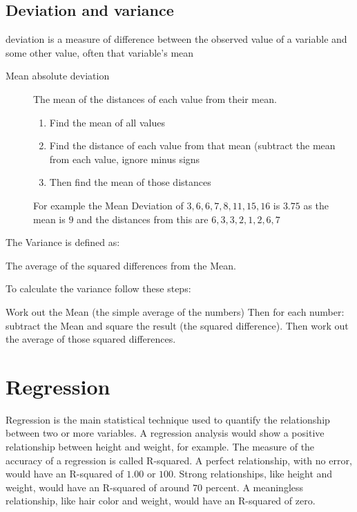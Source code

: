 \subsection{Deviation and variance}
deviation is a measure of difference between the observed value of a variable and some other value, often that variable's mean

\begin{description}
    \item [Mean absolute deviation] The mean of the distances of each value from their mean.
\begin{enumerate}
    \item Find the mean of all values
    \item Find the distance of each value from that mean (subtract the mean from each value, ignore minus signs
    \item Then find the mean of those distances
\end{enumerate} For example the Mean Deviation of $3, 6, 6, 7, 8, 11, 15, 16$ is $3.75$ as the mean is $9$ and the distances from this are $6, 3, 3, 2, 1, 2, 6, 7$
\end{description}

The Variance is defined as:

The average of the squared differences from the Mean.

To calculate the variance follow these steps:

Work out the Mean (the simple average of the numbers)
Then for each number: subtract the Mean and square the result (the squared difference).
Then work out the average of those squared differences.


\section{Regression}
Regression is the main statistical technique used to quantify the relationship between two or more variables. A regression analysis would show a positive relationship between height and weight, for example. The measure of the accuracy of a regression is called R-squared. A perfect relationship, with no error, would have an R-squared of $1.00$ or $100$. Strong relationships, like height and weight, would have an R-squared of around $70$ percent. A meaningless relationship, like hair color and weight, would have an R-squared of zero.

